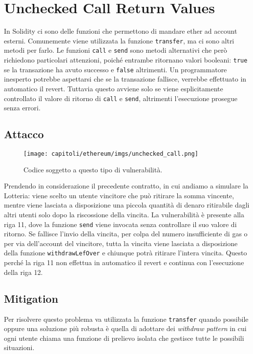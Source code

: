 \section{Unchecked Call Return Values}

In Solidity ci sono delle funzioni che permettono di mandare ether ad account
esterni. Comunemente viene utilizzata la funzione \verb|transfer|, ma ci sono
altri metodi per farlo. Le funzioni \verb|call| e \verb|send| sono metodi
alternativi che però richiedono particolari attenzioni, poiché entrambe
ritornano valori booleani: \verb|true| se la transazione ha avuto successo e
\verb|false| altrimenti. Un programmatore inesperto potrebbe aspettarsi che se
la transazione fallisce, verrebbe effettuato in automatico il revert.
Tuttavia questo avviene solo se viene esplicitamente controllato il valore di
ritorno di \verb|call| e \verb|send|, altrimenti l'esecuzione prosegue senza errori.

\subsection{Attacco}

\begin{figure}[H]
      \centering
      \texttt{[image: capitoli/ethereum/imgs/unchecked\_call.png]}
      \caption{Codice soggetto a questo tipo di vulnerabilità.}
\end{figure}

Prendendo in considerazione il precedente contratto, in cui andiamo a simulare
la Lotteria: viene scelto un utente vincitore che può ritirare la somma vincente,
mentre viene lasciata a disposizione una piccola quantità di denaro ritirabile
dagli altri utenti solo dopo la riscossione della vincita.
La vulnerabilità è presente alla riga 11, dove la funzione \verb|send| viene
invocata senza controllare il suo valore di ritorno. Se fallisce l'invio della
vincita, per colpa del numero insufficiente di gas o per via dell'account del
vincitore, tutta la vincita viene lasciata a disposizione della funzione
\verb|withdrawLefOver| e chiunque potrà ritirare l'intera vincita.
Questo perché la riga 11 non effettua in automatico il revert e continua
con l'esecuzione della riga 12.

\subsection{Mitigation}

Per risolvere questo problema va utilizzata la funzione \verb|transfer|
quando possibile oppure una soluzione più robusta è quella di adottare dei
\textit{withdraw pattern} in cui ogni utente chiama una funzione di prelievo
isolata che gestisce tutte le possibili situazioni.

